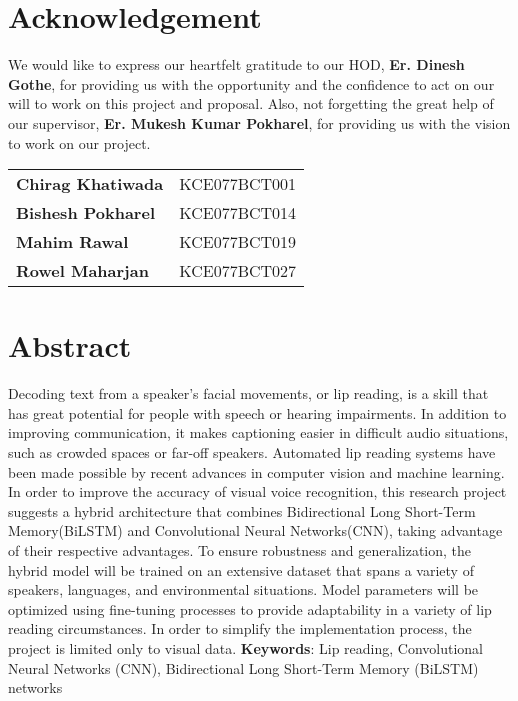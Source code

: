             \chapter*{Acknowledgement}
            \normalsize
            
            We would like to express our heartfelt gratitude to our HOD, \textbf{Er. Dinesh Gothe}, for providing us with the opportunity and the confidence to act on our will to work on this project and proposal. Also, not forgetting the great help of our supervisor, \textbf{Er. Mukesh Kumar Pokharel}, for providing us with the vision to work on our project.


            \vspace{1 cm}


            \begin{tabular}{ll}
                \centering
                \textbf{Chirag Khatiwada} & KCE077BCT001 \\
                \textbf{Bishesh Pokharel} & KCE077BCT014 \\
                \textbf{Mahim Rawal} & KCE077BCT019 \\
                \textbf{Rowel Maharjan} & KCE077BCT027 \\
            \end{tabular}

                   

   
		\break
		
		\large
			\chapter*{Abstract}
		\normalsize
			Decoding text from a speaker's facial movements, or lip reading, is a skill that has great potential for people with speech or hearing impairments. In addition to improving communication, it makes captioning easier in difficult audio situations, such as crowded spaces or far-off speakers. Automated lip reading systems have been made possible by recent advances in computer vision and machine learning. In order to improve the accuracy of visual voice recognition, this research project suggests a hybrid architecture that combines Bidirectional Long Short-Term Memory(BiLSTM) and Convolutional Neural Networks(CNN), taking advantage of their respective advantages. To ensure robustness and generalization, the hybrid model will be trained on an extensive dataset that spans a variety of speakers, languages, and environmental situations. Model parameters will be optimized using fine-tuning processes to provide adaptability in a variety of lip reading circumstances. In order to simplify the implementation process, the project is limited only to visual data. 
            \break	\break
            \textbf{Keywords}: Lip reading, Convolutional Neural Networks (CNN),
            Bidirectional Long Short-Term Memory (BiLSTM) networks

